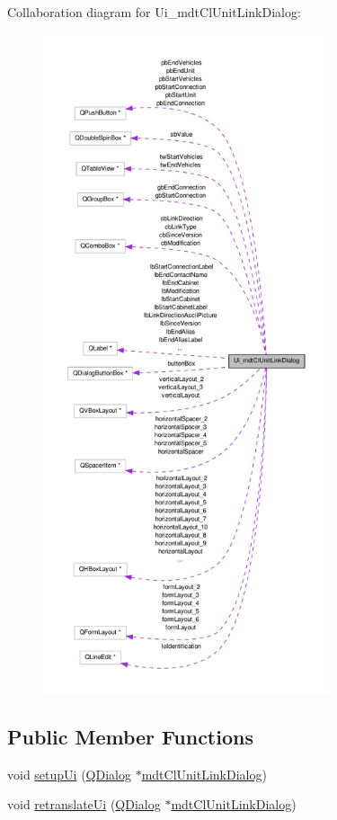Collaboration diagram for Ui\-\_\-mdt\-Cl\-Unit\-Link\-Dialog\-:
\nopagebreak
\begin{figure}[H]
\begin{center}
\leavevmode
\includegraphics[height=550pt]{class_ui__mdt_cl_unit_link_dialog__coll__graph}
\end{center}
\end{figure}
\subsection*{Public Member Functions}
\begin{DoxyCompactItemize}
\item 
void \hyperlink{class_ui__mdt_cl_unit_link_dialog_aa2310fe0eeed6b9b24a590ae2d314f9b}{setup\-Ui} (\hyperlink{class_q_dialog}{Q\-Dialog} $\ast$\hyperlink{classmdt_cl_unit_link_dialog}{mdt\-Cl\-Unit\-Link\-Dialog})
\item 
void \hyperlink{class_ui__mdt_cl_unit_link_dialog_a9d163ec0f9fa2241d276d1e6e4b77246}{retranslate\-Ui} (\hyperlink{class_q_dialog}{Q\-Dialog} $\ast$\hyperlink{classmdt_cl_unit_link_dialog}{mdt\-Cl\-Unit\-Link\-Dialog})
\end{DoxyCompactItemize}
